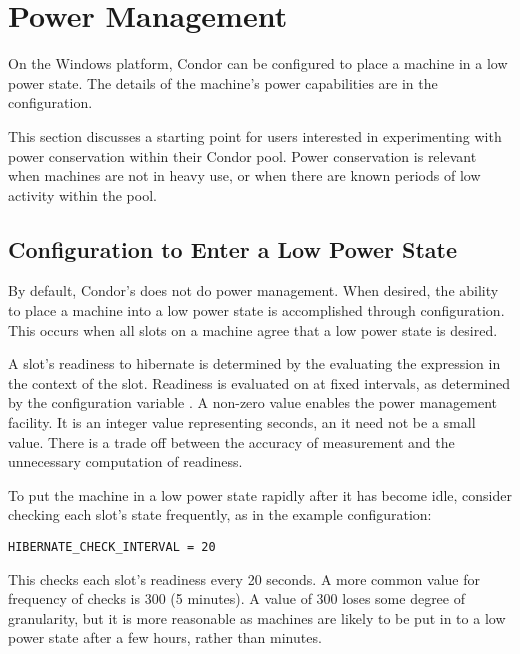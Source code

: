 \section{\label{sec:power-man}Power Management}

On the Windows platform,
Condor can be configured to place a machine in a low power state.  
The details of the machine's power capabilities are in the
configuration. 

This section discusses a starting point for users interested in 
experimenting with power conservation within their Condor pool.
Power conservation is relevant when machines are not in heavy use,
or when there are known periods of low activity within the pool.

\subsection{Configuration to Enter a Low Power State}

By default, Condor's does not do power management.
When desired, the ability to place a machine into a low
power state is accomplished through configuration.
This occurs when all slots on a machine agree that a low power state
is desired.

A slot's readiness to hibernate is determined by the 
evaluating the  expression in the context of the slot.
Readiness is evaluated on at fixed intervals, 
as determined by the configuration variable
.
A non-zero value enables the power management facility.
It is an integer value representing seconds,
an it need not be a small value.
There is a trade off between the accuracy of measurement and 
the unnecessary computation of readiness.  

To put the machine in a low power state rapidly
after it has become idle, consider checking each slot's state frequently,
as in the example configuration:

\begin{verbatim}
HIBERNATE_CHECK_INTERVAL = 20
\end{verbatim}

This checks each slot's readiness every 20 seconds.
A more common value for frequency of checks is 300 (5 minutes).
A value of 300 loses some degree of granularity,
but it is more reasonable as machines are likely to be put 
in to a low power state after a few hours, rather than minutes.
 
